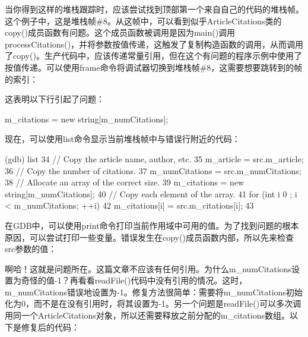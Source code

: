 当你得到这样的堆栈跟踪时，应该尝试找到顶部第一个来自自己的代码的堆栈帧。这个例子中，这是堆栈帧\#8。从这帧中，可以看到似乎ArticleCitations类的copy()成员函数有问题。这个成员函数被调用是因为main()调用processCitations()，并将参数按值传递，这触发了复制构造函数的调用，从而调用了copy()。生产代码中，应该传递常量引用，但在这个有问题的程序示例中使用了按值传递。可以使用frame命令将调试器切换到堆栈帧\#8，这需要想要跳转到的帧的索引：


这表明以下行引起了问题：

\begin{cpp}
m_citations = new string[m_numCitations];
\end{cpp}

现在，可以使用list命令显示当前堆栈帧中与错误行附近的代码：

\begin{shell}
(gdb) list
34      // Copy the article name, author, etc.
35      m_article = src.m_article;
36      // Copy the number of citations.
37      m_numCitations = src.m_numCitations;
38      // Allocate an array of the correct size.
39      m_citations = new string[m_numCitations];
40      // Copy each element of the array.
41      for (int i { 0 }; i < m_numCitations; ++i) {
42          m_citations[i] = src.m_citations[i];
43      }
\end{shell}

在GDB中，可以使用print命令打印当前作用域中可用的值。为了找到问题的根本原因，可以尝试打印一些变量。错误发生在copy()成员函数内部，所以先来检查src参数的值：


啊哈！这就是问题所在。这篇文章不应该有任何引用。为什么m\_numCitations设置为奇怪的值-1？再看看readFile()代码中没有引用的情况。这时，m\_numCitations错误地设置为-1。修复方法很简单：需要将m\_numCitations初始化为0，而不是在没有引用时，将其设置为-1。另一个问题是readFile()可以多次调用同一个ArticleCitations对象，所以还需要释放之前分配的m\_citations数组。以下是修复后的代码：

